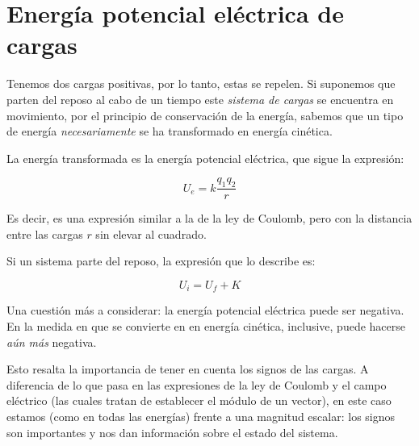 \section{Energía potencial eléctrica de cargas}

Tenemos dos cargas positivas,
por lo tanto,
estas se repelen.
Si suponemos que parten del reposo al cabo de un tiempo
este \textit{sistema de cargas} se encuentra en movimiento,
por el principio de conservación de la energía,
sabemos que un tipo de energía \textit{necesariamente} se ha transformado en energía cinética.

La energía transformada es la energía potencial eléctrica,
que sigue la expresión:

\vspace{.5cm}
\begin{equation*}
U_e = k\frac{q_1q_2}{r}    
\end{equation*}
\vspace{.5cm}

Es decir,
es una expresión similar a la de la ley de Coulomb,
pero con la distancia entre las cargas \(r\) sin elevar al cuadrado.

Si un sistema parte del reposo, 
la expresión que lo describe es:

\vspace{.5cm}
\begin{equation*}
    U_i = U_f + K    
\end{equation*}
\vspace{.5cm}

Una cuestión más a considerar:
la energía potencial eléctrica puede ser negativa.
En la medida en que se convierte en en energía cinética,
inclusive,
puede hacerse \textit{aún más} negativa.

Esto resalta la importancia de tener en cuenta los signos de las cargas.
A diferencia de lo que pasa en las expresiones de la ley de Coulomb y el campo eléctrico
(las cuales tratan de establecer el módulo de un vector),
en este caso estamos (como en todas las energías) frente a una magnitud escalar:
los signos son importantes y nos dan información sobre el estado del sistema.
